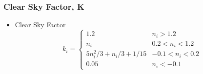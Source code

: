 \documentclass{beamer}
\begin{document}
\begin{frame}
  \frametitle{Clear Sky Factor, \acs{K}}
  \begin{itemize}
  \item Clear Sky Factor
    \begin{equation*}
      k_i= \begin{cases}
        1.2 & n_i > 1.2 \\
        n_i & 0.2 < n_i < 1.2 \\
        5n_i^2/3+n_i/3 +1/15 & -0.1 < n_i < 0.2 \\
        0.05 & n_i < -0.1 
      \end{cases}
    \end{equation*}
  \end{itemize}
\end{frame}
\end{document}
